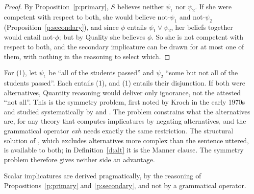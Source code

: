 \documentclass{situationist-preprint}
\begin{document}
\begin{proof}
By Proposition~\ref{p:primary}, $S$ believes neither $\psi_1$ nor $\psi_2$. If she were competent with respect to both, she would believe not-$\psi_1$ and not-$\psi_2$ (Proposition~\ref{p:secondary}), and since $\phi$ entails $\psi_1 \lor \psi_2$, her beliefs together would entail not-$\phi$; but by Quality she believes $\phi$. So she is not competent with respect to both, and the secondary implicature can be drawn for at most one of them, with nothing in the reasoning to select which.
\end{proof}

For (1), let $\psi_1$ be \enquote{all of the students passed} and $\psi_2$ \enquote{some but not all of the students passed}. Each entails (1), and (1) entails their disjunction. If both were alternatives, Quantity reasoning would deliver only ignorance, not the attested \enquote{not all}. This is the symmetry problem, first noted by Kroch in the early 1970s and studied systematically by \citet{Katzir2007} and \citet{FoxKatzir2011}. The problem constrains what the alternatives are, for any theory that computes implicatures by negating alternatives, and the grammatical operator \emph{exh} needs exactly the same restriction. The structural solution of \citet{Katzir2007}, which excludes alternatives more complex than the sentence uttered, is available to both; in Definition~\ref{d:alt} it is the Manner clause. The symmetry problem therefore gives neither side an advantage.

\begin{theorem}\label{t:prag}
Scalar implicatures are derived pragmatically, by the reasoning of Propositions~\ref{p:primary} and~\ref{p:secondary}, and not by a grammatical operator.
\end{theorem}
\end{document}
